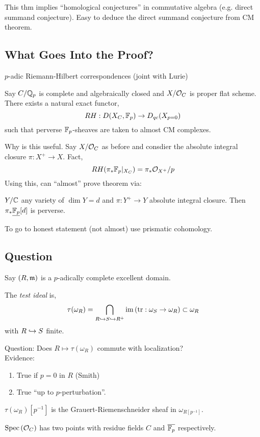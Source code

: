 \documentclass[12pt]{article}
\begin{document}
\begin{rmk}
This thm implies ``homological conjectures'' in commutative algebra (e.g. direct summand conjecture). Easy to deduce the direct summand conjecture from CM theorem. 
\end{rmk}

\subsection{What Goes Into the Proof?}

$p$-adic Riemann-Hilbert correspondences (joint with Lurie)

\begin{theorem}
Say $C / \mathbb{Q}_p$ is complete and algebraically closed and $X / \mathcal{O}_{C}$ is proper flat scheme. There exists a natural exact functor,
\[ RH : D(X_C, \mathbb{F}_p) \to D_{qc}(X_{p = 0}) \]
such that perverse $\mathbb{F}_p$-sheaves are taken to almost CM complexes. 
\end{theorem}

Why is this useful. Say $X / \mathcal{O}_{C}$ as before and consdier the absolute integral closure $\pi : X^+ \to X$. Fact,
\[ RH(\pi_* \mathbb{F}_p |_{X_C}) = \pi_* \mathcal{O}_{X^+} / p \]
Using this, can ``almost'' prove theorem via:

\begin{lemma}
$Y / \mathbb{C}$ any variety of $\dim{Y} = d$ and $\pi : Y^+ \to Y$ absolute integral closure. Then $\pi_* \underline{\mathbb{F}_p} [d]$ is perverse.
\end{lemma}

To go to honest statement (not almost) use prismatic cohomology. 

\subsection{Question}

Say $(R, \mathfrak{m})$ is a $p$-adically complete excellent domain.

\begin{defn}
The \textit{test ideal} is,
\[ \tau(\omega_R) = \bigcap_{R \hookrightarrow S \hookrightarrow R^+} \operatorname{\mathrm{im}}{(\operatorname{\mathrm{tr}} : \omega_S \to \omega_R)} \subset \omega_R \]
with $R \hookrightarrow S$ finite.
\end{defn}

Question: Does $R \mapsto \tau(\omega_R)$ commute with localization?
\bigskip\\
Evidence:
\begin{enumerate}
\item True if $p = 0$ in $R$ (Smith)
\item True ``up to $p$-perturbation''.
\end{enumerate}

\begin{cor}
$\tau(\omega_R)[p^{-1}]$ is the Grauert-Riemenschneider sheaf in $\omega_{R[p^{-1}]}$.
\end{cor}


\begin{rmk}
$\mathrm{Spec}\left( \mathcal{O}_{C} \right)$ has two points with residue fields $C$ and $\overline{\mathbb{F}_p}$ respectively. 
\end{rmk}
\end{document}
